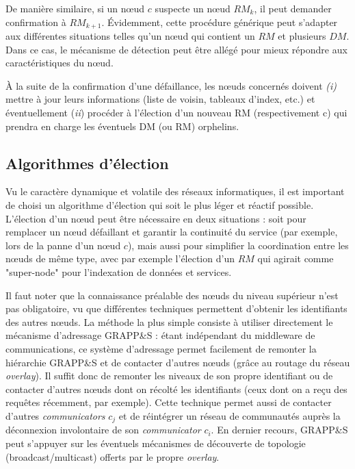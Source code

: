 De manière similaire, si un n{\oe}ud $c$ suspecte un n{\oe}ud $RM_k$, il peut demander confirmation à $RM_{k+1}$. Évidemment, cette procédure générique peut s'adapter aux différentes situations telles qu'un n{\oe}ud qui contient un $RM$ et plusieurs $DM$. Dans ce cas, le mécanisme de détection peut être allégé pour mieux répondre aux caractéristiques du n{\oe}ud. 

À la suite de la confirmation d'une défaillance, les n{\oe}uds concernés doivent \textit{(i)} mettre à jour leurs informations (liste de voisin, tableaux d'index, etc.) et éventuellement (\textit{ii}) procéder à l'élection d'un nouveau RM (respectivement c) qui prendra en charge les éventuels DM (ou RM) orphelins.  

\subsection{Algorithmes d'élection\label{sec:election}}

Vu le caractère dynamique et volatile des réseaux informatiques, il est important de choisi un algorithme d'élection qui soit le plus léger et réactif possible. L'élection d'un n{\oe}ud peut être nécessaire en deux situations : soit pour remplacer un n{\oe}ud défaillant et garantir la continuité du service (par exemple, lors de la panne d'un n{\oe}ud $c$), mais aussi pour simplifier la coordination entre les n{\oe}uds de même type, avec par exemple l'élection d'un $RM$ qui agirait comme "super-node" pour l'indexation de données et services. 

Il faut noter que la connaissance préalable des n{\oe}uds du niveau supérieur n'est pas obligatoire, vu que différentes techniques permettent d'obtenir les identifiants des autres n{\oe}uds. La méthode la plus simple consiste à utiliser directement le mécanisme d'adressage GRAPP\&S : étant indépendant du middleware de communications, ce système d'adressage permet facilement de remonter la hiérarchie GRAPP\&S et de contacter d'autres n{\oe}uds (grâce au routage du réseau \textit{overlay}). Il suffit donc de remonter les niveaux de son propre identifiant ou de contacter d'autres n{\oe}uds dont on récolté les identifiants (ceux dont on a reçu des requêtes récemment, par exemple). Cette technique permet aussi de contacter d'autres \textit{communicators} $c_j$ et de réintégrer un réseau de communautés auprès la déconnexion involontaire de son \textit{communicator} $c_i$. En dernier recours, GRAPP\&S peut s'appuyer sur les éventuels mécanismes de découverte de topologie (broadcast/multicast) offerts par le propre \textit{overlay}.

